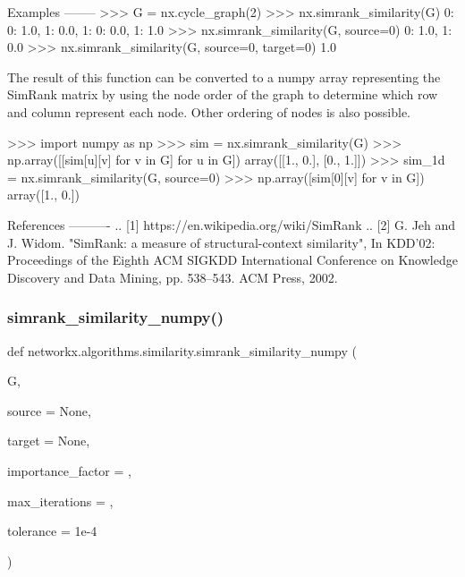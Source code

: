 \begin{DoxyVerb}
Examples
--------
>>> G = nx.cycle_graph(2)
>>> nx.simrank_similarity(G)
{0: {0: 1.0, 1: 0.0}, 1: {0: 0.0, 1: 1.0}}
>>> nx.simrank_similarity(G, source=0)
{0: 1.0, 1: 0.0}
>>> nx.simrank_similarity(G, source=0, target=0)
1.0

The result of this function can be converted to a numpy array
representing the SimRank matrix by using the node order of the
graph to determine which row and column represent each node.
Other ordering of nodes is also possible.

>>> import numpy as np
>>> sim = nx.simrank_similarity(G)
>>> np.array([[sim[u][v] for v in G] for u in G])
array([[1., 0.],
       [0., 1.]])
>>> sim_1d = nx.simrank_similarity(G, source=0)
>>> np.array([sim[0][v] for v in G])
array([1., 0.])

References
----------
.. [1] https://en.wikipedia.org/wiki/SimRank
.. [2] G. Jeh and J. Widom.
       "SimRank: a measure of structural-context similarity",
       In KDD'02: Proceedings of the Eighth ACM SIGKDD
       International Conference on Knowledge Discovery and Data Mining,
       pp. 538--543. ACM Press, 2002.
\end{DoxyVerb}
 \mbox{\label{namespacenetworkx_1_1algorithms_1_1similarity_a60b65f73b755236d64f0fa6e2006f310}} 
\subsubsection{\texorpdfstring{simrank\+\_\+similarity\+\_\+numpy()}{simrank\_similarity\_numpy()}}
{\footnotesize\ttfamily def networkx.\+algorithms.\+similarity.\+simrank\+\_\+similarity\+\_\+numpy (\begin{DoxyParamCaption}\item[{}]{G,  }\item[{}]{source = {\ttfamily None},  }\item[{}]{target = {\ttfamily None},  }\item[{}]{importance\+\_\+factor = {},  }\item[{}]{max\+\_\+iterations = {},  }\item[{}]{tolerance = {\ttfamily 1e-\/4} }\end{DoxyParamCaption})}

